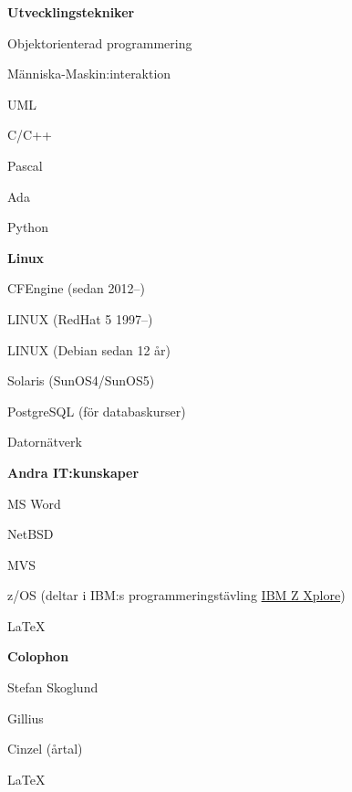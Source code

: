 \documentclass[a4paper,swedish,11pt]{article}
\begin{document}
\begin{minipage}[t]{0.73\textwidth}
  \textbf{Utvecklingstekniker}
  \begin{description}[nosep]
    \small
  \item Objektorienterad programmering
  \item Människa-Maskin:interaktion
  \item UML
  \item C/C++
  \item Pascal
  \item Ada
  \item Python
  \end{description}

  \textbf{Linux}
  \begin{description}[nosep,font=\sffamily\bfseries]
    \small%
  \item CFEngine (sedan 2012--)
  \item LINUX (RedHat 5 1997--)
  \item LINUX (Debian sedan 12 år)
  \item Solaris (SunOS4/SunOS5)
  \item PostgreSQL (för databaskurser)
  \item Datornätverk
  \end{description}

  \textbf{Andra IT:kunskaper}
  \begin{description}[nosep,itemsep=0.1ex]
  \item MS Word
  \item NetBSD
  \item MVS
  \item z/OS (deltar i IBM:s programmeringstävling \href{https://ibmzxplore.influitive.com/forum/}{IBM Z Xplore})
  \item \LaTeX
  \end{description}
\end{minipage}
\begin{minipage}[t]{0.24\textwidth}
  \vspace{20cm}
  \textbf{Colophon}
  \begin{description}[nosep,itemsep=0.1ex]
    \setlength\itemsep{0.1ex}\small%
    \raggedleft%
  \item Stefan Skoglund {}
  \item Gillius
  \item Cinzel (årtal)
  \item \LaTeX%
  \end{description}%
\end{minipage}%
\end{document}

